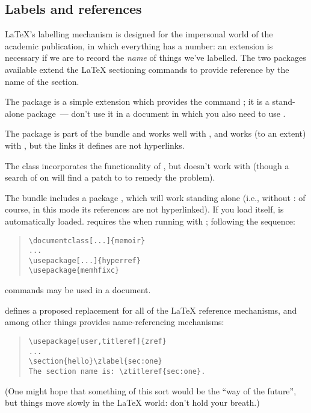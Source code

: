 
\subsection{Labels and references}


\LaTeX{}'s labelling mechanism is designed for the impersonal world of
the academic publication, in which everything has a number: an
extension is necessary if we are to record the \emph{name} of things
we've labelled.  The two packages available extend the \LaTeX{}
sectioning commands to provide reference by the name of the section.

The  package is a simple extension which provides
the command ; it is a stand-alone package~--- don't use it
in a document in which you also need to use .

The  package is part of the  bundle
and works well with , and works (to an extent) with
, but the links it defines are not hyperlinks.

The  class incorporates the functionality of
, but doesn't work with  (though a
search of  on  will
find a patch to  to remedy the problem).

The  bundle includes a package ,
which will work standing alone (i.e., without : of
course, in this mode its references are not hyperlinked).  If you load
 itself,  is automatically loaded.
 requires the  when running with
; following the sequence:
\begin{quote}
\begin{verbatim}
\documentclass[...]{memoir}
...
\usepackage[...]{hyperref}
\usepackage{memhfixc}
\end{verbatim}
\end{quote}
 commands may be used in a  document.

 defines a proposed replacement for all of the \LaTeX{}
reference mechanisms, and among other things provides
name-referencing mechanisms:
\begin{quote}
\begin{verbatim}
\usepackage[user,titleref]{zref}
...
\section{hello}\zlabel{sec:one}
The section name is: \ztitleref{sec:one}.
\end{verbatim}
\end{quote}
(One might hope that something of this sort would be the ``way of the
future'', but things move slowly in the \LaTeX{} world: don't hold
your breath.) 

